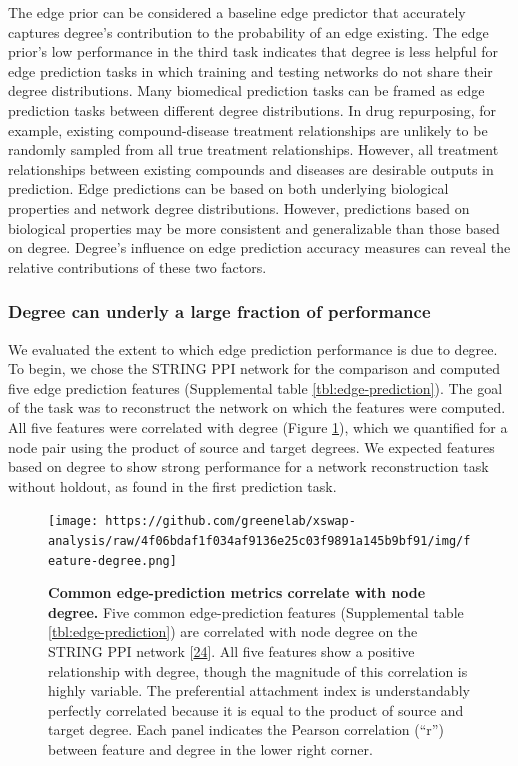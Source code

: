 The edge prior can be considered a baseline edge predictor that accurately captures degree's contribution to the probability of an edge existing.
The edge prior's low performance in the third task indicates that degree is less helpful for edge prediction tasks in which training and testing networks do not share their degree distributions.
Many biomedical prediction tasks can be framed as edge prediction tasks between different degree distributions.
In drug repurposing, for example, existing compound-disease treatment relationships are unlikely to be randomly sampled from all true treatment relationships.
However, all treatment relationships between existing compounds and diseases are desirable outputs in prediction.
Edge predictions can be based on both underlying biological properties and network degree distributions.
However, predictions based on biological properties may be more consistent and generalizable than those based on degree.
Degree's influence on edge prediction accuracy measures can reveal the relative contributions of these two factors.

\hypertarget{degree-can-underly-a-large-fraction-of-performance}{%
\subsubsection{Degree can underly a large fraction of performance}\label{degree-can-underly-a-large-fraction-of-performance}}

We evaluated the extent to which edge prediction performance is due to degree.
To begin, we chose the STRING PPI network for the comparison and computed five edge prediction features (Supplemental table \ref{tbl:edge-prediction}).
The goal of the task was to reconstruct the network on which the features were computed.
All five features were correlated with degree (Figure \ref{fig:feature-degree}), which we quantified for a node pair using the product of source and target degrees.
We expected features based on degree to show strong performance for a network reconstruction task without holdout, as found in the first prediction task.

\begin{figure}
\hypertarget{fig:feature-degree}{%
\centering
\texttt{[image: https://github.com/greenelab/xswap-analysis/raw/4f06bdaf1f034af9136e25c03f9891a145b9bf91/img/feature-degree.png]}
\caption{\textbf{Common edge-prediction metrics correlate with node degree.}
Five common edge-prediction features (Supplemental table \ref{tbl:edge-prediction}) are correlated with node degree on the STRING PPI network {[}\protect\hyperlink{ref-fkKIuC7X}{24}{]}.
All five features show a positive relationship with degree, though the magnitude of this correlation is highly variable.
The preferential attachment index is understandably perfectly correlated because it is equal to the product of source and target degree.
Each panel indicates the Pearson correlation (``r'') between feature and degree in the lower right corner.}\label{fig:feature-degree}
}
\end{figure}

